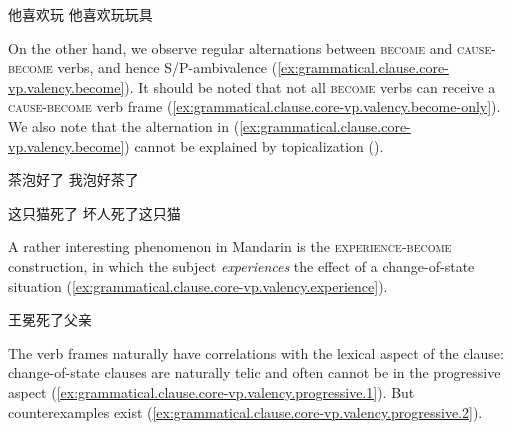 \documentclass[UTF8, a4paper, oneside, scheme=plain, 12pt]{ctexrep}
\newcommand*{\category}[1]{\textsc{#1}}
\begin{document}
\begin{exe}
    \ex\label{ex:grammatical.clause.core-vp.valency.do} \begin{xlist}
        \ex 他喜欢玩
        \ex 他喜欢玩玩具
    \end{xlist}
\end{exe}

On the other hand, we observe regular alternations between \category{become} and \category{cause}-\category{become} verbs,
and hence S/P-ambivalence (\ref{ex:grammatical.clause.core-vp.valency.become}).
It should be noted that not all \category{become} verbs can receive a \category{cause}-\category{become} verb frame (\ref{ex:grammatical.clause.core-vp.valency.become-only}).
We also note that the alternation in (\ref{ex:grammatical.clause.core-vp.valency.become})
cannot be explained by topicalization ().

\begin{exe}
    \ex\label{ex:grammatical.clause.core-vp.valency.become} \begin{xlist}
        \ex\label{ex:grammatical.clause.core-vp.valency.become.1} 茶泡好了
        \ex 我泡好茶了
    \end{xlist}

    \ex\label{ex:grammatical.clause.core-vp.valency.become-only}
    \begin{xlist}
        \ex\label{ex:grammatical.clause.core-vp.valency.become-only.1} 这只猫死了
        \ex *坏人死了这只猫
    \end{xlist}
\end{exe}

A rather interesting phenomenon in Mandarin is the \category{experience}-\category{become} construction,
in which the subject \emph{experiences} the effect of a change-of-state situation
(\ref{ex:grammatical.clause.core-vp.valency.experience}).

\begin{exe}
    \ex\label{ex:grammatical.clause.core-vp.valency.experience}
    \begin{xlist}
        \ex 王冕死了父亲
    \end{xlist}
\end{exe}

The verb frames naturally have correlations with the lexical aspect of the clause:
change-of-state clauses are naturally telic and often cannot be in the progressive aspect
(\ref{ex:grammatical.clause.core-vp.valency.progressive.1}).
But counterexamples exist
(\ref{ex:grammatical.clause.core-vp.valency.progressive.2}).
\end{document}
